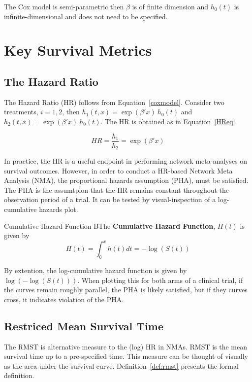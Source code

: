 The Cox model is semi-parametric then $\beta$ is of finite dimension and $h_0(t)$ is infinite-dimensional and does not need to be specified. 

\section{Key Survival Metrics}

\subsection{The Hazard Ratio}
The Hazard Ratio (HR) follows from Equation~\ref{coxmodel}. Consider two treatments, $i = 1, 2$, then $h_1(t, x) = \exp(\beta'x) \ h_0(t)$ and $h_2(t, x) = \exp(\beta'x) \ h_0(t)$. The HR is obtained as in Equation~\ref{HReq}.

\begin{equation}
    HR = \frac{h_1}{h_2} = \exp(\beta' x)
    \label{HReq}
\end{equation}

In practice, the HR is a useful endpoint in performing network meta-analyses on survival outcomes. However, in order to conduct a HR-based Network Meta Analysis (NMA), the proportional hazards assumption (PHA), must be satisfied. The PHA is the assumtpion that the HR remains constant throughout the observation period of a trial. It can be tested by visual-inspection of a log-cumulative hazards plot. 

\begin{definition}{Cumulative Hazard Function}
    BThe \textbf{Cumulative Hazard Function}, $H(t)$ is given by 
    \[
        H(t) = \int_{0}^{x}h(t)dt = -\log(S(t))  
    \]
\end{definition}

By extention, the log-cumulative hazard function is given by $\log(-\log(S(t)))$. When plotting this for both arms of a clinical trial, if the curves remain roughly parallel, the PHA is likely satisfied, but if they curves cross, it indicates violation of the PHA.

\subsection{Restriced Mean Survival Time}
The RMST is alternative measure to the (log) HR in NMAs. RMST is the mean survival time up to a pre-specified time. This measure can be thought of visually as the area under the survival curve. Definition~\ref{def:rmst} presents the formal definition.

